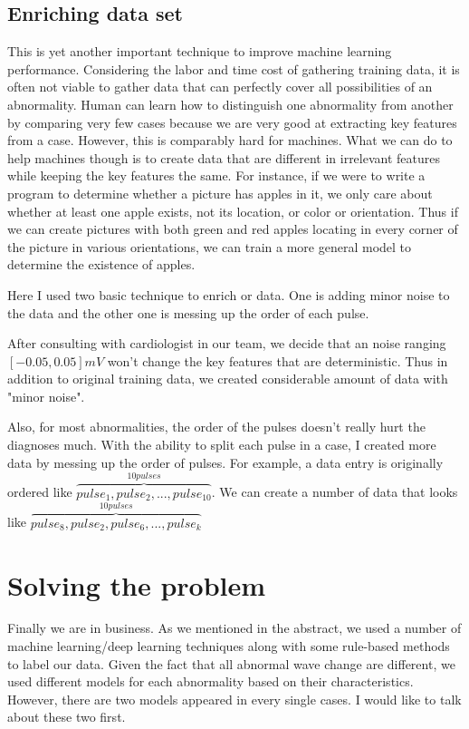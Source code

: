 \documentclass[%
 reprint,
 amsmath,amssymb,
 aps,
]{revtex4-2}
\begin{document}
\subsection{Enriching data set}
This is yet another important technique to improve machine learning performance. Considering the labor and time cost of gathering training data, it is often not viable to gather data that can perfectly cover all possibilities of an abnormality. Human can learn how to distinguish one abnormality from another by comparing very few cases because we are very good at extracting key features from a case. However, this is comparably hard for machines. What we can do to help machines though is to create data that are different in irrelevant features while keeping the key features the same. For instance, if we were to write a program to determine whether a picture has apples in it, we only care about whether at least one apple exists, not its location, or color or orientation. Thus if we can create pictures with both green and red apples locating in every corner of the picture in various orientations, we can train a more general model to determine the existence of apples.

Here I used two basic technique to enrich or data. One is adding minor noise to the data and the other one is messing up the order of each pulse. 

After consulting with cardiologist in our team, we decide that an noise ranging $[-0.05, 0.05] mV$ won't change the key features that are deterministic. Thus in addition to original training data, we created considerable amount of data with "minor noise".

Also, for most abnormalities, the order of the pulses doesn't really hurt the diagnoses much. With the ability to split each pulse in a case, I created more data by messing up the order of pulses. For example, a data entry is originally ordered like $\overbrace{pulse_1, pulse_2, ... , pulse_10}^{10 pulses}$. We can create a number of data that looks like $\overbrace{pulse_8, pulse_2, pulse_6, ... , pulse_k}^{10 pulses}$

\section{Solving the problem}
Finally we are in business. As we mentioned in the abstract, we used a number of machine learning/deep learning techniques along with some rule-based methods to label our data. Given the fact that all abnormal wave change are different, we used different models for each abnormality based on their characteristics. However, there are two models appeared in every single cases. I would like to talk about these two first.
\end{document}
